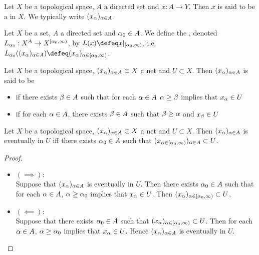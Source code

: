 \documentclass{book}
\begin{document}
	\begin{defn} 
	Let $X$ be a topological space, $A$ a directed set and $x:A \rightarrow Y$. Then $x$ is said to be a  in $X$. We typically write $(x_{\alpha})_{\alpha \in A}$. 
	\end{defn}

	\begin{defn} 
		Let $X$ be a set, $A$ a directed set and $\alpha_0 \in A$. We define the , denoted $L_{\alpha_0}: X^{A} \rightarrow X^{[\alpha_0, \infty)}$, by $L(x) \defeq x|_{[\al_0, \infty)}$, i.e. $L_{\al_0}((x_{\al})_{\al \in A}) \defeq (x_{\al})_{\al \in [\al_0, \infty)}$.
	\end{defn}
	
	\begin{defn} 
	Let $X$ be a topological space, $(x_{\alpha})_{\alpha \in A} \subset X$ a net and $U \subset X$.
	Then $(x_{\alpha})_{\alpha \in A}$ is said to be 
	\begin{itemize}
	\item {} if there exists $\beta \in A$ such that for each $\alpha \in A$ $\alpha \geq \beta$ implies that $x_{\alpha} \in U$
	\item {}  if for each $\alpha \in A$, there exists $\beta \in A$ such that $\beta \geq \alpha $ and $x_{\beta} \in U$
	\end{itemize}
	\end{defn}

	\begin{ex} 
		Let $X$ be a topological space, $(x_{\alpha})_{\alpha \in A} \subset X$ a net and $U \subset X$. Then $(x_{\alpha})_{\alpha \in A}$ is eventually in $U$ iff there exists $\alpha_0 \in A$ such that $(x_{\alpha \in [\alpha_0, \infty)})_{\alpha \in A} \subset U$.
	\end{ex}

	\begin{proof}\
		\begin{itemize}
			\item $(\implies):$ \\
			Suppose that $(x_{\alpha})_{\alpha \in A}$ is eventually in $U$. Then there exists $\alpha_0 \in A$ such that for each $\alpha \in A$, $\alpha \geq \alpha_0$ implies that $x_{\alpha} \in U$. Then $(x_{\alpha})_{\alpha \in [\alpha_0, \infty)} \subset U$.
			\item $(\impliedby):$ \\
			Suppose that there exists $\alpha_0 \in A$ such that $(x_{\alpha})_{\alpha \in [\alpha_0, \infty)} \subset U$. Then for each $\alpha \in A$, $\alpha \geq \alpha_0$ implies that $x_{\alpha} \in U$. Hence $(x_{\alpha})_{\alpha \in A}$ is eventually in $U$.
		\end{itemize}
	\end{proof}
\end{document}
